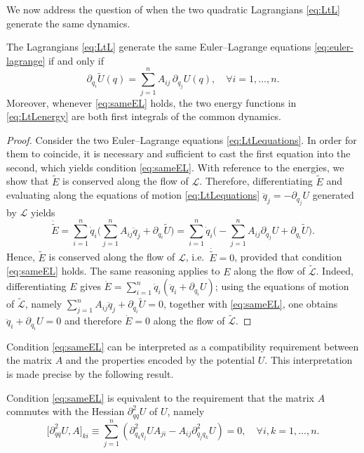 \documentclass{rendiconti}
\begin{document}
We now address the question of when the two quadratic Lagrangians
\eqref{eq:LtL} generate the same dynamics.
\begin{proposition}
The Lagrangians \eqref{eq:LtL}
generate the same Euler--Lagrange equations \eqref{eq:euler-lagrange} if and only if
\begin{equation}
\label{eq:sameEL}
\partial_{q_i} \widetilde U(q) = \sum_{j=1}^n A_{ij} \, \partial_{q_j} U(q), \quad \forall i=1,\dots,n.
\end{equation}
Moreover, whenever \eqref{eq:sameEL} holds, the two energy functions in \eqref{eq:LtLenergy}
are both first integrals of the common dynamics.
\end{proposition}
%
\begin{proof}
Consider the two Euler--Lagrange equations \eqref{eq:LtLequations}. In order for them to coincide,
it is necessary and sufficient to cast the first equation into the second, which yields
condition \eqref{eq:sameEL}.
With reference to the energies, we show that $\widetilde E$ is conserved along the flow of
$\mathcal{L}$. Therefore, differentiating $\widetilde E$ and evaluating along the equations of motion
\eqref{eq:LtLequations} $\ddot q_j=-\partial_{q_j}U$ generated by $\mathcal{L}$ yields
\begin{equation}
\label{eq:passrr}
\textstyle
\dot{\widetilde E} =
\sum_{i=1}^n\dot q_i
\big(\sum_{j=1}^n A_{ij}\ddot q_j
+\partial_{q_i}\widetilde U
\big)=\sum_{i=1}^n
\dot q_i\big(
-
\sum_{j=1}^n
A_{ij}\partial_{q_j}U
+
\partial_{q_i}\widetilde U\big).
\end{equation}
Hence, $\widetilde E$ is conserved along the flow of $\mathcal{L}$, i.e.\ $\dot{\widetilde E} =0$,
provided that condition \eqref{eq:sameEL} holds.
The same reasoning applies to $E$ along the flow of $\widetilde{\mathcal{L}}$. Indeed,
differentiating $E$ gives $\dot E=\sum_{i=1}^n\dot q_i(\ddot q_i+\partial_{q_i}U)$; using
the equations of motion of $\widetilde{\mathcal{L}}$, namely
$\sum_{j=1}^n A_{ij}\ddot q_j + \partial_{q_i}\widetilde U=0$, together with \eqref{eq:sameEL},
one obtains $\ddot q_i+\partial_{q_i}U=0$ and therefore $\dot E=0$ along the flow of
$\widetilde{\mathcal{L}}$.
\end{proof}
%
Condition \eqref{eq:sameEL} can be interpreted as a compatibility requirement
between the matrix $A$ and the properties encoded by the potential $U$.
This interpretation is made precise by the following result.
%
\begin{proposition}
\label{eq:commHess}
Condition \eqref{eq:sameEL} is equivalent
to the requirement that the matrix $A$ commutes with the Hessian $\partial^2_{qq}U$ of $U$, namely
\begin{equation}
\big[\partial^2_{qq}U,A\big]_{ki}\equiv\sum_{j=1}^n\left( \partial^2_{q_k q_j}\!U A_{ji}-A_{ij} \partial^2_{q_j q_k} U\right)=0, \quad \forall i,k=1,\dots,n.
\end{equation}
\end{proposition}
\end{document}
